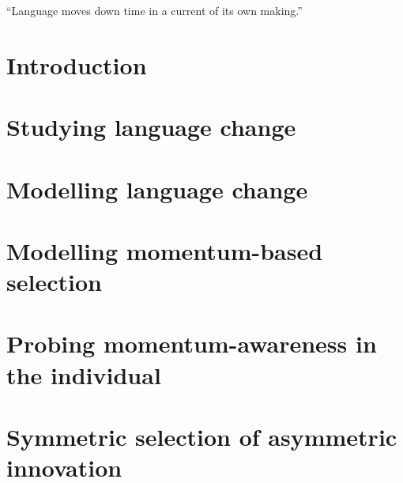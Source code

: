 \documentclass[twoside,10pt]{book}
\begin{document}
\tableofcontents

\listoffigures
\listoftables

\cleardoublepage
\thispagestyle{empty}
\epigraph{``Language moves down time in a current of its own making.''}{\citep[p.160]{Sapir1921}}

\mainmatter

\chapter{Introduction}
\label{ch:intro}


\chapter{Studying language change}
\label{ch:review}


\chapter{Modelling language change}
\label{ch:modelling}


\chapter{Modelling momentum-based selection} %
\label{ch:momentummodel}


\chapter{Probing momentum-awareness in the individual}
\label{ch:questionnaire}


\chapter{Symmetric selection of asymmetric innovation}%
\label{ch:bigpicture}

\end{document}
